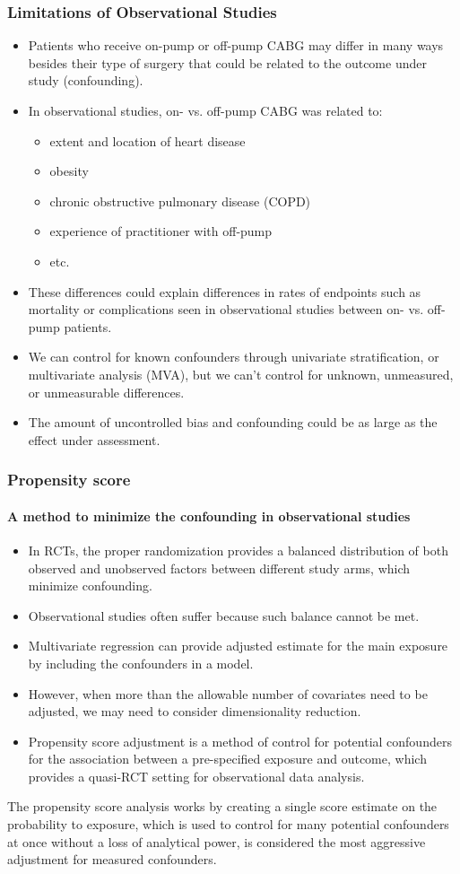 \documentclass[table,10pt]{beamer}
\begin{document}
\begin{CJK*}{UTF8}{gbsn}
\begin{frame}[t]
\frametitle{Limitations of Observational Studies}
\begin{itemize}
	\item Patients who receive on-pump or off-pump CABG may differ in many ways 
		besides their type of surgery that could be related to the outcome under 
		study (confounding).
	\item In observational studies, on- vs. off-pump CABG was related to:
	\begin{itemize}
		\item extent and location of heart disease
		\item obesity
		\item chronic obstructive pulmonary disease (COPD)
		\item experience of practitioner with off-pump
		\item etc.
	\end{itemize}
	\item These differences could explain differences in rates of endpoints such 
		as mortality or complications seen in observational studies between on- vs. 
		off-pump patients.
	\item We can control for known confounders through univariate stratification, 
		or multivariate analysis (MVA), but we can't control for unknown, unmeasured, 
		or unmeasurable differences.
	\item The amount of uncontrolled bias and confounding could be as large as the 
		effect under assessment.
\end{itemize}
\end{frame}


\begin{frame}[t]
\frametitle{Propensity score}
\framesubtitle{A method to minimize the confounding in observational studies}
\begin{itemize}
	\item In RCTs, the proper randomization provides a \alert{balanced distribution} of both observed 
		and unobserved factors between different study arms, which \alert{minimize confounding}.
	\item Observational studies often suffer because such balance cannot be met.
	\item Multivariate regression can provide adjusted estimate for the main exposure by 
		including the confounders in a model.
	\item However, when more than the allowable number of covariates need to be adjusted, we 
		may need to consider dimensionality reduction.
	\item Propensity score adjustment is a method of control for potential confounders for the 
		association between a pre-specified exposure and outcome, which provides a \alert{
		quasi-RCT} setting for observational data analysis. 
\end{itemize}
The propensity score analysis works by creating a single score estimate on the probability to 
exposure, which is used to control for many potential confounders at once without a loss of 
analytical power, is considered the most aggressive adjustment for measured confounders.
\end{frame}



\end{CJK*}
\end{document}
